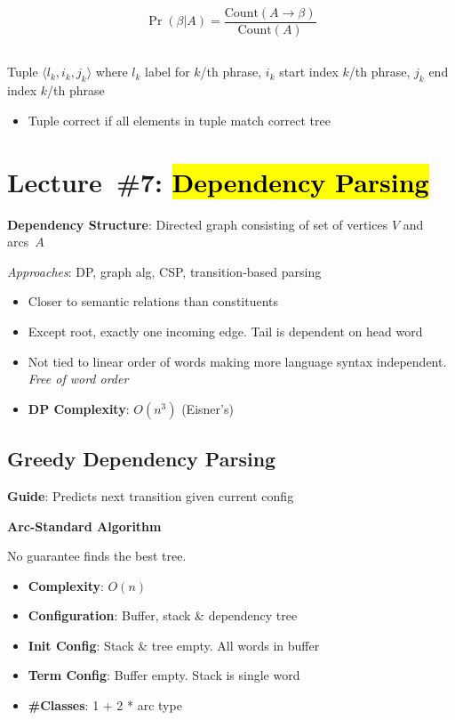 \documentclass[9pt]{extarticle}
\renewcommand{\green}[1]{{\color{ForestGreen} #1}}
\newcommand{\greenbf}[1]{\textbf{\green{#1}}}
\begin{document}
\begin{multicols}{3}
  \begin{equation*}
    \Pr(\beta \vert A) = \frac{\text{Count}(A \rightarrow \beta)}{\text{Count}(A)}
  \end{equation*}

  \subsection*{}

  Tuple ${\langle l_k, i_k, j_k  \rangle}$ where $l_k$ label for $k$\-/th phrase, $i_k$ start index $k$\-/th phrase, $j_k$ end index $k$\-/th phrase
  \begin{itemize}
    \item Tuple correct if all elements in tuple match correct tree
  \end{itemize}

  \section*{Lecture~\#7: \hl{Dependency Parsing}}

  \greenbf{Dependency Structure}: Directed graph consisting of set of vertices $V$ and arcs~$A$

  \textit{Approaches}: DP, graph alg, CSP, transition-based parsing

  \begin{itemize}
    \item Closer to semantic relations than constituents
    \item Except root, exactly one incoming edge. Tail is dependent on head word
    \item Not tied to linear order of words making more language syntax independent. \textit{Free of word order}
    \item \textbf{DP Complexity}: $O(n^3)$ (Eisner's)
  \end{itemize}

  \subsection*{Greedy Dependency Parsing}

  \greenbf{Guide}: Predicts next transition given current config

  \greenbf{Arc-Standard Algorithm}

  No guarantee finds the best tree.

  \begin{itemize}
    \item \textbf{Complexity}: $O(n)$
    \item \textbf{Configuration}: Buffer, stack \& dependency tree
    \item \textbf{Init Config}: Stack \& tree empty. All words in buffer
    \item \textbf{Term Config}: Buffer empty. Stack is single word
    \item \textbf{\#Classes}: 1 + 2 * arc type
  \end{itemize}


\end{multicols}
\end{document}
